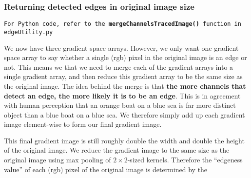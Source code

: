 \documentclass[11pt]{article}
\begin{document}
\subsubsection{Returning detected edges in original image size}
\begin{center}
\texttt{For Python code, refer to the {\bf mergeChannelsTracedImage()} function in edgeUtility.py}
\end{center}
We now have three gradient space arrays. However, we only want one gradient space array to say whether a single (rgb) pixel in the original image is an edge or not. This means we that we need to merge each of the gradient arrays into a single gradient array, and then reduce this gradient array to be the same size as the original image. The idea behind the merge is that \textbf{the more channels that detect an edge, the more likely it is to be an edge}. This is in agreement with human perception that an orange boat on a blue sea is far more distinct object than a blue boat on a blue sea. We therefore simply add up each gradient image element-wise to form our final gradient image.

This final gradient image is still roughly double the width and double the height of the original image. We reduce the gradient image to the same size as the original image using max pooling of $2 \times 2$-sized kernels. Therefore the ``edgeness value'' of each (rgb) pixel of the original image is determined by the 
\end{document}
